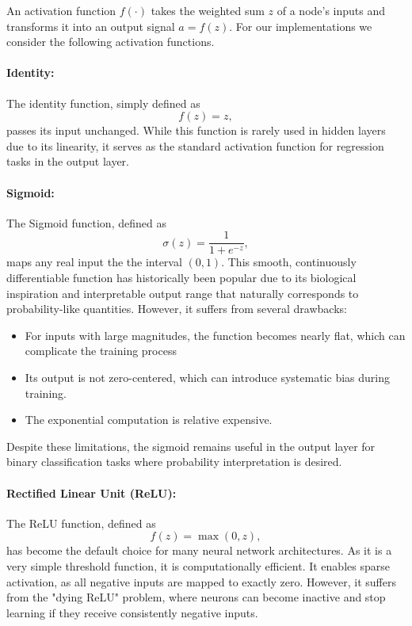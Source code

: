 An activation function \( f(\cdot) \) takes the weighted sum \( z \) of a node's inputs and transforms it into an output signal \( a = f(z) \). For our implementations we consider the following activation functions.

\paragraph*{Identity:}
The identity function, simply defined as
\begin{equation*}
    f(z) = z,
\end{equation*}
passes its input unchanged. While this function is rarely used in hidden layers due to its linearity, it serves as the standard activation function for regression tasks in the output layer.
\paragraph*{Sigmoid:}
The Sigmoid function, defined as
\begin{equation}
    \sigma(z) = \frac{1}{1 + e^{-z}},
\end{equation}
maps any real input the the interval \( (0, 1) \). This smooth, continuously differentiable function has historically been popular due to its biological inspiration and interpretable output range that naturally corresponds to probability-like quantities. However, it suffers from several drawbacks:
\begin{itemize}
    \item For inputs with large magnitudes, the function becomes nearly flat, which can complicate the training process
    \item Its output is not zero-centered, which can introduce systematic bias during training.
    \item The exponential computation is relative expensive.
\end{itemize}

Despite these limitations, the sigmoid remains useful in the output layer for binary classification tasks where probability interpretation is desired.

\paragraph*{Rectified Linear Unit (ReLU):}
The ReLU function, defined as
\begin{equation}
    f(z) = \max(0, z),
\end{equation}
has become the default choice for many neural network architectures. As it is a very simple threshold function, it is computationally efficient. It enables sparse activation, as all negative inputs are mapped to exactly zero. However, it suffers from the "dying ReLU" problem, where neurons can become inactive and stop learning if they receive consistently negative inputs.

